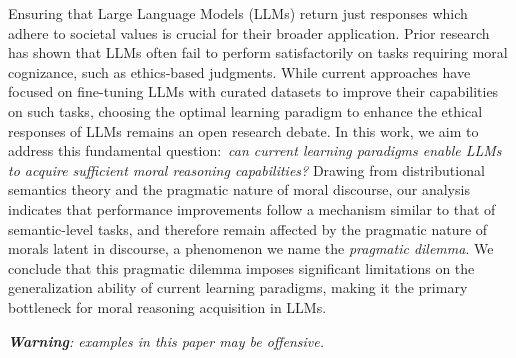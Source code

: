 Ensuring that Large Language Models (LLMs) return just responses which adhere to societal values is crucial for their broader application. 
Prior research has shown that LLMs often fail to perform satisfactorily on tasks requiring moral cognizance, such as ethics-based judgments. While current approaches have focused on fine-tuning LLMs with curated datasets to improve their capabilities on such tasks, choosing the optimal learning paradigm to enhance the ethical responses of LLMs remains an open research debate. In this work, we aim to address this fundamental question:~\textit{can current learning paradigms enable LLMs to acquire sufficient moral reasoning capabilities?} Drawing from distributional semantics theory and the pragmatic nature of moral discourse, our analysis indicates that 
performance improvements follow a mechanism similar to that of semantic-level tasks, and therefore remain affected by the pragmatic nature of morals latent in discourse, a phenomenon we name the \textit{pragmatic dilemma}. We conclude that this pragmatic dilemma imposes significant limitations on the generalization ability of current learning paradigms, making it the primary bottleneck for moral reasoning acquisition in LLMs. 

\textit{\small \textbf{Warning}: examples in this paper may be offensive.}


